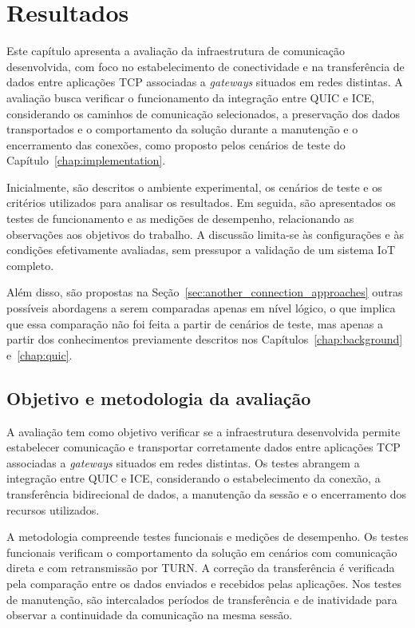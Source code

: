 \chapter{Resultados}
\label{chap:results}

Este capítulo apresenta a avaliação da infraestrutura de comunicação desenvolvida, com foco no estabelecimento de conectividade e na transferência de dados entre aplicações TCP associadas a \textit{gateways} situados em redes distintas. A avaliação busca verificar o funcionamento da integração entre QUIC e ICE, considerando os caminhos de comunicação selecionados, a preservação dos dados transportados e o comportamento da solução durante a manutenção e o encerramento das conexões, como proposto pelos cenários de teste do Capítulo~\ref{chap:implementation}.

Inicialmente, são descritos o ambiente experimental, os cenários de teste e os critérios utilizados para analisar os resultados. Em seguida, são apresentados os testes de funcionamento e as medições de desempenho, relacionando as observações aos objetivos do trabalho. A discussão limita-se às configurações e às condições efetivamente avaliadas, sem pressupor a validação de um sistema IoT completo.

Além disso, são propostas na Seção~\ref{sec:another_connection_approaches} outras possíveis abordagens a serem comparadas apenas em nível lógico, o que implica que essa comparação não foi feita a partir de cenários de teste, mas apenas a partir dos conhecimentos previamente descritos nos Capítulos~\ref{chap:background} e~\ref{chap:quic}.

\section{Objetivo e metodologia da avaliação}

A avaliação tem como objetivo verificar se a infraestrutura desenvolvida permite estabelecer comunicação e transportar corretamente dados entre aplicações TCP associadas a \textit{gateways} situados em redes distintas. Os testes abrangem a integração entre QUIC e ICE, considerando o estabelecimento da conexão, a transferência bidirecional de dados, a manutenção da sessão e o encerramento dos recursos utilizados.

A metodologia compreende testes funcionais e medições de desempenho. Os testes funcionais verificam o comportamento da solução em cenários com comunicação direta e com retransmissão por TURN. A correção da transferência é verificada pela comparação entre os dados enviados e recebidos pelas aplicações. Nos testes de manutenção, são intercalados períodos de transferência e de inatividade para observar a continuidade da comunicação na mesma sessão.

